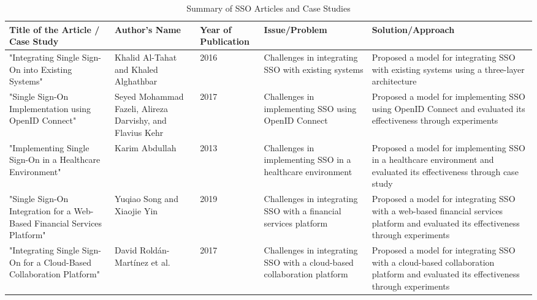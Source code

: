 \documentclass{article}
\begin{document}
\begin{table}[h!]
    \centering
    \caption{Summary of SSO Articles and Case Studies}
    \begin{tabular}{|p{4cm}|p{3cm}|p{2cm}|p{3cm}|p{3cm}|}
        \hline
        \textbf{Title of the Article / Case Study}                               & \textbf{Author's Name}                                    & \textbf{Year of Publication} & \textbf{Issue/Problem}                                                  & \textbf{Solution/Approach}                                                                                                            \\
        \hline
        "Integrating Single Sign-On into Existing Systems"                       & Khalid Al-Tahat and Khaled Alghathbar                     & 2016                         & Challenges in integrating SSO with existing systems                     & Proposed a model for integrating SSO with existing systems using a three-layer architecture                                           \\
        \hline
        "Single Sign-On Implementation using OpenID Connect"                     & Seyed Mohammad Fazeli, Alireza Darvishy, and Flavius Kehr & 2017                         & Challenges in implementing SSO using OpenID Connect                     & Proposed a model for implementing SSO using OpenID Connect and evaluated its effectiveness through experiments                        \\
        \hline
        "Implementing Single Sign-On in a Healthcare Environment"                & Karim Abdullah                                            & 2013                         & Challenges in implementing SSO in a healthcare environment              & Proposed a model for implementing SSO in a healthcare environment and evaluated its effectiveness through case study                  \\
        \hline
        "Single Sign-On Integration for a Web-Based Financial Services Platform" & Yuqiao Song and Xiaojie Yin                               & 2019                         & Challenges in integrating SSO with a financial services platform        & Proposed a model for integrating SSO with a web-based financial services platform and evaluated its effectiveness through experiments \\
        \hline
        "Integrating Single Sign-On for a Cloud-Based Collaboration Platform"    & David Roldán-Martínez et al.                              & 2017                         & Challenges in integrating SSO with a cloud-based collaboration platform & Proposed a model for integrating SSO with a cloud-based collaboration platform and evaluated its effectiveness through experiments    \\

\end{tabular}
\end{table}
\end{document}

